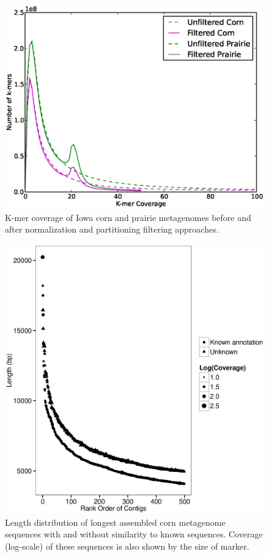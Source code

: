 \documentclass{pnastwo}
\begin{document}
\begin{figure}
\begin{center}
\centerline{\includegraphics[width=.7\textwidth]{./figures/fig2-diginormhist.eps}}
\caption{K-mer coverage of Iowa corn and prairie metagenomes before
  and after normalization and partitioning filtering approaches.}
\label{diginormcoverage}
\end{center}
\end{figure}


\begin{figure}
\begin{center}
\centerline{\includegraphics[width=.7\textwidth]{./figures/corn-cov-len-500.eps}}
\caption{Length distribution of longest assembled corn metagenome sequences with and without similarity to known sequences.  Coverage (log-scale) of these sequences is also shown by the size of marker. }
\label{cornlength}
\end{center}
\end{figure}
\end{document}
